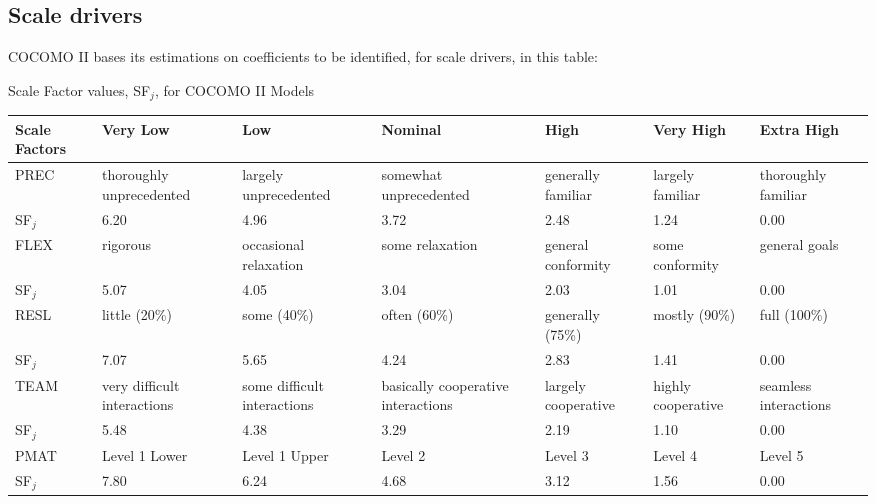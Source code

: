 \documentclass{scrreprt}
\newcommand{\addfactor}[7]{
	#1 & #2 & #3 & #4 & #5 & #6 & #7 \\
}
\newcommand{\addfactorvalues}[6]{
SF$_j$ & #1 & #2 & #3 & #4 & #5 & #6 \\\hline
}
\newenvironment{scaledriverstable}[1]{
	\setlength{\LTleft}{-40pt}
	\begin{center}
	#1 
	\begin{longtable}{|p{\dimexpr.16\textwidth}|p{\dimexpr.14\textwidth}|p{\dimexpr.14\textwidth}|p{\dimexpr.14\textwidth}|p{\dimexpr.14\textwidth}|p{\dimexpr.14\textwidth}|p{\dimexpr.14\textwidth}|}
	\hline
}{
	\hline\end{longtable}\end{center}
}
\begin{document}
\subsection{Scale drivers}
COCOMO II bases its estimations on coefficients to be identified, for scale drivers, in this table: 
\begin{scaledriverstable}{Scale Factor values, SF$_j$, for COCOMO II Models}
	Scale Factors & Very Low & Low & Nominal & High & Very High & Extra High\\\hline
	\addfactor{PREC}{thoroughly unprecedented}{largely unprecedented}{somewhat unprecedented}{generally familiar}{largely familiar}{thoroughly familiar}
	\addfactorvalues{6.20}{\cellcolor[gray]{0.75}4.96}{3.72}{2.48}{1.24}{0.00}
	\addfactor{FLEX}{rigorous}{occasional relaxation}{some relaxation}{general conformity}{some conformity}{general goals}
	\addfactorvalues{5.07}{4.05}{\cellcolor[gray]{0.75}3.04}{2.03}{1.01}{0.00}
	\addfactor{RESL}{little (20\%)}{some (40\%)}{often (60\%)}{generally (75\%)}{mostly (90\%)}{full (100\%)}
	\addfactorvalues{7.07}{5.65}{4.24}{\cellcolor[gray]{0.75}2.83}{1.41}{0.00}
	\addfactor{TEAM}{very difficult interactions}{some difficult interactions}{basically cooperative interactions}{largely cooperative}{highly cooperative}{seamless interactions}
	\addfactorvalues{5.48}{4.38}{3.29}{\cellcolor[gray]{0.75}2.19}{1.10}{0.00}
	\addfactor{PMAT}{Level 1 Lower}{Level 1 Upper}{Level 2}{Level 3}{Level 4}{Level 5}
	\addfactorvalues{7.80}{6.24}{\cellcolor[gray]{0.75}4.68}{3.12}{1.56}{0.00}
\end{scaledriverstable}
\end{document}
